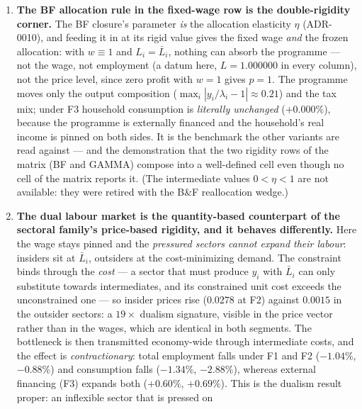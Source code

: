 \documentclass[11pt]{article}
\begin{document}
\begin{enumerate}
      $\delta = +0.5$ and in $70$--$76$ at $\delta = -0.5$, the slower rate
      being the positive feedback of increasing returns --- proximity to
      instability, not a numerical accident).
\item \textbf{The BF allocation rule in the fixed-wage row is the double-rigidity
      corner.} The BF closure's parameter \emph{is} the allocation elasticity
      $\eta$ (ADR-0010), and feeding it in at its rigid value gives the fixed
      wage \emph{and} the frozen allocation: with $w \equiv 1$ and
      $L_i = \bar{L}_i$, nothing can absorb the programme --- not the wage, not
      employment (a datum here, $L = 1.000000$ in every column), not the price
      level, since zero profit with $w = 1$ gives $p = 1$. The programme moves
      only the output composition ($\max_i|y_i/\lambda_i - 1| \approx 0.21$) and
      the tax mix; under F3 household consumption is \emph{literally unchanged}
      ($+0.000\%$), because the programme is externally financed and the
      household's real income is pinned on both sides. It is the benchmark the
      other variants are read against --- and the demonstration that the two
      rigidity rows of the matrix (BF and GAMMA) compose into a well-defined
      cell even though no cell of the matrix reports it. (The intermediate
      values $0 < \eta < 1$ are not available: they were retired with the B\&F
      reallocation wedge.)
\item \textbf{The dual labour market is the quantity-based counterpart of the
      sectoral family's price-based rigidity, and it behaves differently.} Here
      the wage stays pinned and the \emph{pressured sectors cannot expand their
      labour}: insiders sit at $\bar{L}_i$, outsiders at the cost-minimizing
      demand. The constraint binds through the \emph{cost} --- a sector that must
      produce $y_i$ with $\bar{L}_i$ can only substitute towards intermediates,
      and its constrained unit cost exceeds the unconstrained one --- so insider
      prices rise ($0.0278$ at F2) against $0.0015$ in the outsider sectors: a
      $19\times$ dualism signature, visible in the price vector rather than in
      the wages, which are identical in both segments. The bottleneck is then
      transmitted economy-wide through intermediate costs, and the effect is
      \emph{contractionary}: total employment falls under F1 and F2
      ($-1.04\%$, $-0.88\%$) and consumption falls ($-1.34\%$, $-2.88\%$),
      whereas external financing (F3) expands both ($+0.60\%$, $+0.69\%$). This
      is the dualism result proper: an inflexible sector that is pressed on

\end{enumerate}
\end{document}
